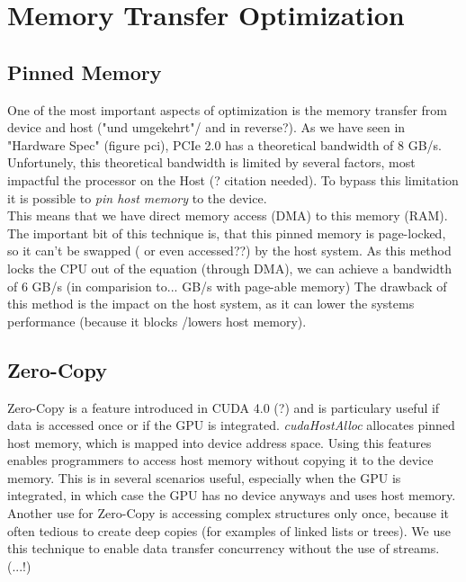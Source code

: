 \section{Memory Transfer Optimization}
\label{sec:transfer}
\subsection{Pinned Memory}
One of the most important aspects of optimization is the memory transfer
from device and host ("und umgekehrt"/ and in reverse?).
As we have seen in "Hardware Spec" (figure pci), PCIe 2.0 has a theoretical bandwidth of 8 GB/s.
Unfortunely, this theoretical bandwidth is limited by several factors, most impactful the processor on the Host (? citation needed).
To bypass this limitation it is possible to \emph{pin host memory} to the device.\\
This means that we have direct memory access (DMA) to this memory (RAM).
The important bit of this technique is, that this pinned memory is page-locked, so it can't be swapped ( or even accessed??) by the host system.
As this method locks the CPU out of the equation (through DMA), we can achieve a bandwidth of 6 GB/s (in comparision to... GB/s with page-able memory)
The drawback of this method is the impact on the host system, as it can lower the systems performance (because it blocks /lowers host memory).
\subsection{Zero-Copy}
Zero-Copy is a feature introduced in CUDA 4.0 (?) and is particulary useful if data is accessed once or if the GPU is integrated.
\emph{cudaHostAlloc} allocates pinned host memory, which is mapped into device address space.
Using this features enables programmers to access host memory without copying it to the device memory.
This is in several scenarios useful, especially when the GPU is integrated,
in which case the GPU has no device anyways and uses host memory.
Another use for Zero-Copy is accessing complex structures only once, because it often tedious to create deep copies (for examples of linked lists or trees).
We use this technique to enable data transfer concurrency without the use of streams. (...!)
